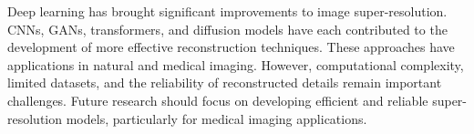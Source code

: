 \documentclass[conference]{IEEEtran}
\begin{document}
Deep learning has brought significant improvements to image super-resolution. CNNs, GANs, transformers, and diffusion models have each contributed to the development of more effective reconstruction techniques. These approaches have applications in natural and medical imaging. However, computational complexity, limited datasets, and the reliability of reconstructed details remain important challenges. Future research should focus on developing efficient and reliable super-resolution models, particularly for medical imaging applications.



\end{document}
